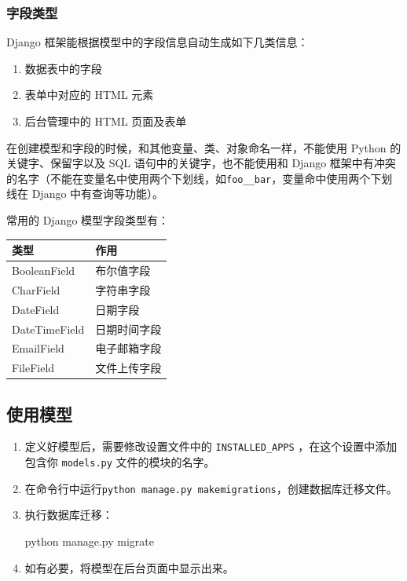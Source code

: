 \documentclass[]{ctexbook}
\newenvironment{Shaded}{\begin{snugshade}}{\end{snugshade}}
\newcommand{\ExtensionTok}[1]{#1}
\newcommand{\NormalTok}[1]{#1}
\providecommand{\tightlist}{%
  \setlength{\itemsep}{0pt}\setlength{\parskip}{0pt}}
\begin{document}
\hypertarget{ux5b57ux6bb5ux7c7bux578b}{%
\subsubsection{字段类型}\label{ux5b57ux6bb5ux7c7bux578b}}

Django 框架能根据模型中的字段信息自动生成如下几类信息：

\begin{enumerate}
\def\labelenumi{\arabic{enumi}.}
\tightlist
\item
  数据表中的字段
\item
  表单中对应的 HTML 元素
\item
  后台管理中的 HTML 页面及表单
\end{enumerate}

在创建模型和字段的时候，和其他变量、类、对象命名一样，不能使用 Python 的关键字、保留字以及 SQL 语句中的关键字，也不能使用和 Django 框架中有冲突的名字（不能在变量名中使用两个下划线，如\texttt{foo\_\_bar}，变量命中使用两个下划线在 Django 中有查询等功能）。

常用的 Django 模型字段类型有：

\begin{longtable}[]{@{}ll@{}}
\toprule
类型 & 作用\tabularnewline
\midrule
\endhead
BooleanField & 布尔值字段\tabularnewline
CharField & 字符串字段\tabularnewline
DateField & 日期字段\tabularnewline
DateTimeField & 日期时间字段\tabularnewline
EmailField & 电子邮箱字段\tabularnewline
FileField & 文件上传字段\tabularnewline
\bottomrule
\end{longtable}

\hypertarget{ux4f7fux7528ux6a21ux578b}{%
\subsection{使用模型}\label{ux4f7fux7528ux6a21ux578b}}

\begin{enumerate}
\def\labelenumi{\arabic{enumi}.}
\item
  定义好模型后，需要修改设置文件中的 \texttt{INSTALLED\_APPS} ，在这个设置中添加包含你 \texttt{models.py} 文件的模块的名字。
\item
  在命令行中运行\texttt{python\ manage.py\ makemigrations}，创建数据库迁移文件。
\item
  执行数据库迁移：

\begin{Shaded}
\begin{Highlighting}[]
\ExtensionTok{python}\NormalTok{ manage.py migrate}
\end{Highlighting}
\end{Shaded}
\item
  如有必要，将模型在后台页面中显示出来。
\end{enumerate}
\end{document}
